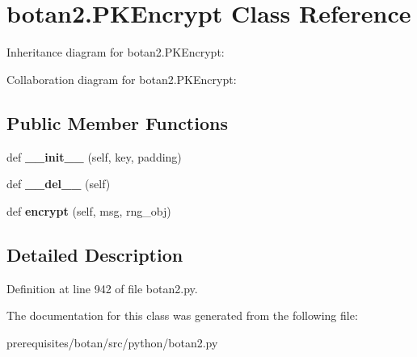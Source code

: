 \hypertarget{classbotan2_1_1_p_k_encrypt}{}\section{botan2.\+P\+K\+Encrypt Class Reference}
\label{classbotan2_1_1_p_k_encrypt}


Inheritance diagram for botan2.\+P\+K\+Encrypt\+:


Collaboration diagram for botan2.\+P\+K\+Encrypt\+:
\subsection*{Public Member Functions}
\begin{DoxyCompactItemize}
\item 
\mbox{\label{classbotan2_1_1_p_k_encrypt_af65f09754b96f68b33a53fd6e9671a2b}} 
def {\bfseries \+\_\+\+\_\+init\+\_\+\+\_\+} (self, key, padding)
\item 
\mbox{\label{classbotan2_1_1_p_k_encrypt_a8259f9174018bcf19b72f1ab973d5af6}} 
def {\bfseries \+\_\+\+\_\+del\+\_\+\+\_\+} (self)
\item 
\mbox{\label{classbotan2_1_1_p_k_encrypt_ae6d5a8b30a837862d1a5f17bc0252fc5}} 
def {\bfseries encrypt} (self, msg, rng\+\_\+obj)
\end{DoxyCompactItemize}


\subsection{Detailed Description}


Definition at line 942 of file botan2.\+py.



The documentation for this class was generated from the following file\+:\begin{DoxyCompactItemize}
\item 
prerequisites/botan/src/python/botan2.\+py\end{DoxyCompactItemize}
